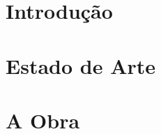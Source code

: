 \documentclass[12pt]{article}
\begin{document}
\section*{Introdução}

\section*{Estado de Arte}


\section*{A Obra}





\end{document}
